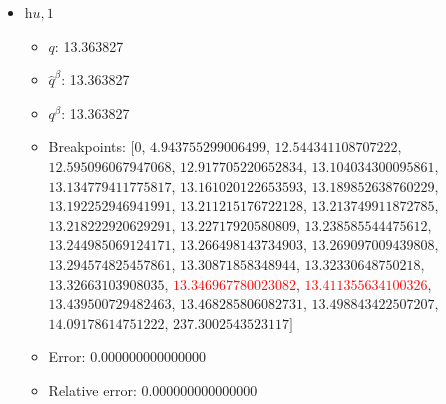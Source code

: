 \documentclass{article}%
\begin{document}
\begin{itemize}
\begin{itemize}
		\item $q$: 37.950853%
		\item $\hat{q}^\beta$: 37.950853%
		\item $q^\beta$: 37.950853%
		\item Breakpoints: $[$$0$, $18.023935870161154$, $21.04660840930274$, $24.97364426355679$, $30.189424467922265$, $34.23465128608717$, $36.670233878040335$, $37.21616748032837$, $37.443498367229196$, $37.47875108132638$, $37.52720514437563$, $37.554741031910254$, $37.612770977560544$, $37.65435035996605$, $37.6551299822246$, $37.682669717644174$, $37.71812813120871$, $37.76995088018704$, $37.78573239590169$, $37.821651654621526$, $37.88148462263016$, $37.9018730666985$, \textcolor{red}{$37.9454585315849$}, \textcolor{red}{$38.035748486883605$}, $38.10872593446926$, $38.21652191748154$, $38.224970554765775$, $38.88483572219945$, $285.4001551947793$$]$%
		\item Error: 0.000000000000000%
		\item Relative error: 0.000000000000000%
	\end{itemize}%
	\item $\textit{hu},1$%
	\begin{itemize}%
		\item $q$: 13.363827%
		\item $\hat{q}^\beta$: 13.363827%
		\item $q^\beta$: 13.363827%
		\item Breakpoints: $[$$0$, $4.943755299006499$, $12.544341108707222$, $12.595096067947068$, $12.917705220652834$, $13.104034300095861$, $13.134779411775817$, $13.161020122653593$, $13.189852638760229$, $13.192252946941991$, $13.211215176722128$, $13.213749911872785$, $13.218222920629291$, $13.22717920580809$, $13.238585544475612$, $13.244985069124171$, $13.266498143734903$, $13.269097009439808$, $13.294574825457861$, $13.30871858348944$, $13.32330648750218$, $13.32663103908035$, \textcolor{red}{$13.346967780023082$}, \textcolor{red}{$13.411355634100326$}, $13.439500729482463$, $13.468285806082731$, $13.498843422507207$, $14.09178614751222$, $237.3002543523117$$]$%
		\item Error: 0.000000000000000%
		\item Relative error: 0.000000000000000%
	\end{itemize}%
\end{itemize}%
\end{document}
